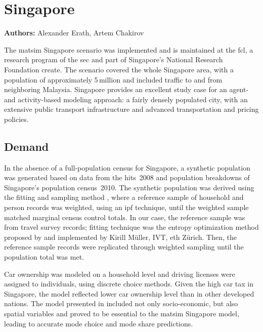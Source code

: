 \section{Singapore}
\label{sec:singapore}
\hfill \textbf{Authors:} Alexander Erath, Artem Chakirov


The \gls{matsim} Singapore scenario \citet[][]{ErathEtAl_TechRep_FCL_forth} was implemented and is maintained at the \gls{fcl}, a research program of the \gls{sec} and part of Singapore's National Research Foundation \gls{create}. The scenario covered the whole Singapore area, with a population of approximately 5\,million and included traffic  to and from neighboring Malaysia. Singapore provides an excellent study case for an agent- and activity-based modeling approach: a fairly densely populated city, with an extensive public transport infrastructure and advanced transportation and pricing policies. 

\subsection{Demand}
In the absence of a full-population census for Singapore, a synthetic population was generated based on data from the \gls{hits}~2008 \citep[][]{Choi_JOUR_2010} and population breakdowns of Singapore’s population census~2010. The synthetic population was derived using the fitting and sampling method \citep{MuellerKAxhausen_TRB_2011}, where a reference sample of household and person records was weighted, using an \gls{ipf} technique, until the weighted sample matched marginal census control totals. In our case, the reference sample was from travel survey records; fitting technique was the entropy optimization method proposed by \citet[][]{BarGeraEtAl_TRB_2009} and implemented by Kirill Müller, IVT, \gls{eth} Zürich. Then, the reference sample records were replicated through weighted sampling until the population total was met. 
 
Car ownership was modeled on a household level and driving licenses were assigned to individuals, using discrete choice methods. Given the high car tax in Singapore, the model reflected lower car ownership level than in other developed nations. The model presented in \citet[][]{VanEggermondEtAl_IATBR_2012} included not only socio-economic, but also spatial variables and proved to be essential to the \gls{matsim} Singapore model, leading to accurate mode choice and mode share predictions. 

